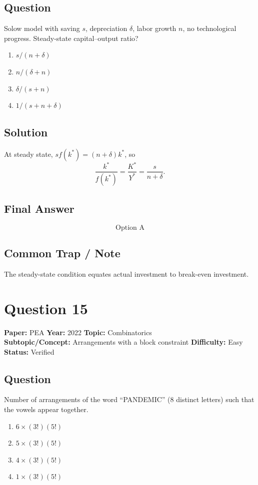 \documentclass[11pt]{article}
\begin{document}
\subsection*{Question}
Solow model with saving $s$, depreciation $\delta$, labor growth $n$, no technological progress.
Steady-state capital--output ratio?
\begin{enumerate}[label=(\Alph*)]
\item $s/(n + \delta)$
\item $n/(\delta + n)$
\item $\delta/(s + n)$
\item $1/(s + n + \delta)$
\end{enumerate}

\subsection*{Solution}
At steady state, $s f(k^*) = (n+\delta) k^*$, so
\[
\frac{k^*}{f(k^*)} = \frac{K^*}{Y^*} = \frac{s}{n+\delta}.
\]

\subsection*{Final Answer}
\[
\boxed{\text{Option A}}
\]

\subsection*{Common Trap / Note}
The steady-state condition equates actual investment to break-even investment.

\section*{Question 15}
\textbf{Paper:} PEA \quad \textbf{Year:} 2022 \quad \textbf{Topic:} Combinatorics \\
\textbf{Subtopic/Concept:} Arrangements with a block constraint \quad \textbf{Difficulty:} Easy \\
\textbf{Status:} Verified

\subsection*{Question}
Number of arrangements of the word ``PANDEMIC'' (8 distinct letters) such that the vowels
appear together.
\begin{enumerate}[label=(\Alph*)]
\item $6 \times (3!)(5!)$
\item $5 \times (3!)(5!)$
\item $4 \times (3!)(5!)$
\item $1 \times (3!)(5!)$
\end{enumerate}
\end{document}
